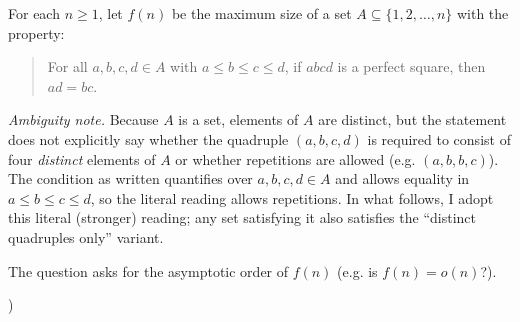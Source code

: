 \noindent For each $n\ge 1$, let $f(n)$ be the maximum size of a set $A\subseteq\{1,2,\dots,n\}$ with the property:

\begin{quote}
For all $a,b,c,d\in A$ with $a\le b\le c\le d$, if $abcd$ is a perfect square, then $ad=bc$.
\end{quote}

\noindent \emph{Ambiguity note.} Because $A$ is a set, elements of $A$ are distinct, but the statement does not explicitly say whether the quadruple $(a,b,c,d)$ is required to consist of four \emph{distinct} elements of $A$ or whether repetitions are allowed (e.g. $(a,b,b,c)$). The condition as written quantifies over $a,b,c,d\in A$ and allows equality in $a\le b\le c\le d$, so the literal reading allows repetitions. In what follows, I adopt this literal (stronger) reading; any set satisfying it also satisfies the ``distinct quadruples only'' variant.

\noindent The question asks for the asymptotic order of $f(n)$ (e.g. is $f(n)=o(n)$?).

)
